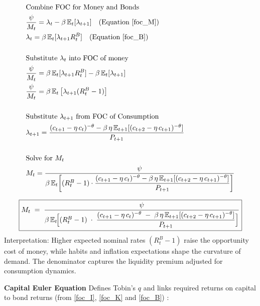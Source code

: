 \documentclass[11pt,preprint]{elsarticle}
\numberwithin{equation}{section}
\numberwithin{figure}{section}
\numberwithin{table}{section}
\begin{document}
\begin{align*}
& \text{Combine FOC for Money and Bonds} \\
& \frac{\psi}{M_t} = \lambda_t - \beta\,\mathbb{E}_t[\lambda_{t+1}] \quad \text{(Equation \ref{foc_M})} \\
& \lambda_t = \beta\,\mathbb{E}_t[\lambda_{t+1}R_t^B] \quad \text{(Equation \ref{foc_B})} \\
& \\
& \text{Substitute } \lambda_t \text{ into FOC of money} \\
& \frac{\psi}{M_t} = \beta\,\mathbb{E}_t[\lambda_{t+1}R_t^B] - \beta\,\mathbb{E}_t[\lambda_{t+1}] \\
& \frac{\psi}{M_t} = \beta\,\mathbb{E}_t\left[\lambda_{t+1}(R_t^B - 1)\right] \\
& \\
& \text{Substitute } \lambda_{t+1} \text{ from FOC of Consumption} \\
& \lambda_{t+1} = \frac{(c_{t+1} - \eta\,c_t)^{-\theta} - \beta\,\eta\,\mathbb{E}_{t+1}[(c_{t+2} - \eta\,c_{t+1})^{-\theta}]}{P_{t+1}} \\
& \\
& \text{Solve for } M_t \\
& M_t = \frac{\psi}{\beta\,\mathbb{E}_t\!\left[ (R_t^B - 1) \cdot \dfrac{(c_{t+1} - \eta\,c_t)^{-\theta} - \beta\,\eta\,\mathbb{E}_{t+1}[(c_{t+2} - \eta\,c_{t+1})^{-\theta}]}{P_{t+1}} \right]}
\end{align*}

\begin{equation}\label{money_demand_app}
\boxed{
  M_t
  \;=\;
  \frac{\psi}
       {\beta\,\mathbb{E}_t\!\Bigl[
         (R_t^B - 1)
         \;\cdot\;
         \dfrac{(c_{t+1} - \eta\,c_t)^{-\theta}
               \;-\;
               \beta\,\eta\,\mathbb{E}_{t+1}[(c_{t+2} - \eta\,c_{t+1})^{-\theta}]}
              {P_{t+1}}
       \Bigr]}
}
\end{equation} Interpretation: Higher expected nominal rates
\((R_t^B - 1)\) raise the opportunity cost of money, while habits and
inflation expectations shape the curvature of demand. The denominator
captures the liquidity premium adjusted for consumption dynamics.

\textbf{Capital Euler Equation } Defines Tobin's \(q\) and links
required returns on capital to bond returns (from \eqref{foc_I},
\eqref{foc_K} and \eqref{foc_B}) :
\end{document}
